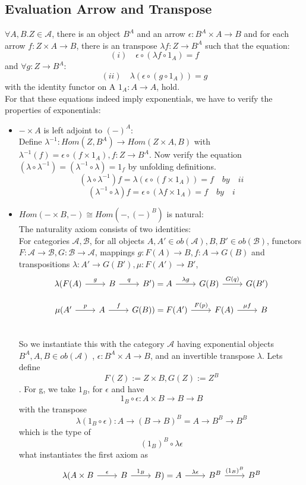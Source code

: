 \subsection{Evaluation Arrow and Transpose}
$\forall A, B. Z\in \mathcal{A}$, there is  an object $B^A$ and an arrow $\epsilon: B^A \times A \to B$ and for each arrow $f:Z \times A \to B$, there is an transpose $\lambda f: Z \to B^A$ such that the equation:
$$(i) \quad \epsilon \circ (\lambda f \circ 1_A) = f$$
and $\forall g: Z \to B^A$:
$$(ii) \quad \lambda (\epsilon \circ (g \circ 1_A))=g$$
with the identity functor on A $1_A: A \to A$, hold.
\\
For that these equations indeed imply exponentials, we have to verify the properties of exponentials:
\begin{itemize}
\item  $- \times A$ is left adjoint to $(-)^A$:
\\Define $\lambda^{-1}: Hom(Z, B^A) \to Hom(Z \times A,B)$ with $\lambda^{-1}(f) = \epsilon \circ (f \times 1_A), f: Z \to B^A$.
Now verify the equation $(\lambda \circ \lambda^{-1}) = (\lambda^{-1} \circ \lambda) = 1_f$ by unfolding definitions.
$$(\lambda \circ \lambda^{-1})f=\lambda(\epsilon \circ (f \times 1_A)) =f \quad by \quad ii$$ 
$$(\lambda^{-1} \circ \lambda)f=\epsilon \circ (\lambda f \times 1_A) =f \quad by \quad i$$
\item $Hom(- \times B, -) \cong Hom(-,(-)^B)$ is natural:
  \\
  The naturality axiom consists of two identities:
  \\
  For categories $\mathcal{A}, \mathcal{B}$, for all objects $A,A' \in ob(\mathcal{A}), B,B' \in ob(\mathcal{B})$, functors $F: \mathcal{A} \to \mathcal{B}, G: \mathcal{B} \to \mathcal{A}$,
  mappings $g:F(A) \to B, f: A \to G(B)$  and transpositions $\lambda:A' \to G(B'),\mu: F(A') \to B'$,
  \[
  \begin{tikzcd}[column sep=normal]
    \lambda(F(A) \arrow{r}{g} & B \arrow{r}{q} & B') = A \arrow{r}{\lambda g} & G(B) \arrow{r}{G(q)} & G(B') 
  \end{tikzcd}
  \]

   \[
   \begin{tikzcd}[column sep=normal]
    \mu(A' \arrow{r}{p} & A \arrow{r}{f} & G(B)) = F(A') \arrow{r}{F(p)} & F(A) \arrow{r}{\mu f} & B 
  \end{tikzcd}
   \]

   \\ So we instantiate this with the category $\mathcal{A}$ having exponential objects $B^A, A,B \in ob(\mathcal{A})$ , $\epsilon: B^A \times A \to B$, and an invertible transpose $\lambda$.
   Lets define $$F(Z):=Z \times B, G(Z):= Z^B$$. 
   For g, we take $1_B$, for $\epsilon$ and have
   $$1_B \circ \epsilon: A \times B \to B \to B $$ with the transpose
   $$\lambda (1_B \circ \epsilon) : A \to (B \to B)^B = A \to B^B \to B^B$$ which is the type of
   $$(1_B)^B \circ \lambda\epsilon$$ what instantiates the first axiom as
   \[
   \begin{tikzcd}[column sep=normal]
     \lambda(A \times B \arrow{r}{\epsilon} & B \arrow{r}{1_B} & B) = A \arrow{r}{\lambda \epsilon} & B^B \arrow{r}{(1_B)^B} & B^B 
   \end{tikzcd}
   \]


\end{itemize}

